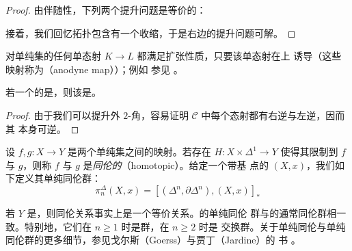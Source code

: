 \begin{proof}
由伴随性，下列两个提升问题是等价的：
\begin{center}
\end{center}
接着，我们回忆拓扑\trHorn{}包含有一个收缩，于是右边的提升问题可解。
\end{proof}
\begin{fact}\label{fact:anodyne-extension}
\trKanComplex{}对单纯集的任何单态射 $K \to L$ 都满足扩张性质，只要该单态射在\trGeometricRealization{}上
诱导\trWeakEquivalence{}（这些映射称为\emph{\trAnodyneMap{}}（anodyne map））；例如
参见 \cite[Theorem 11.3]{GJ09}。
\end{fact}

\begin{lemma}\label{lem:nerve-kan-groupoid}
若一个\trCategory{}的\trNerve{}是\trKanComplex{}，则该\trCategory{}是\trGroupoid{}。
\end{lemma}

\begin{proof}
由于我们可以提升外 $2$-角，容易证明 $\mathcal{C}$ 中每个态射都有右逆与左逆，因而其
本身可逆。
\end{proof}

\begin{definition}\label{def:homotopic}
设 $f, g\colon X \to Y$ 是两个单纯集之间的映射。若存在 $H\colon X \times \Delta^1 \to Y$
使得其限制到 $f$ 与 $g$，则称 $f$ 与 $g$ 是\emph{同伦的}（homotopic）。给定一个带基
点的\trKanComplex{} $(X, x)$，我们如下定义其单纯同伦群：
\[
\pi^{\Delta}_n(X, x) = [(\Delta^n, \partial\Delta^n), (X, x)]_{*}
\]
\end{definition}

\begin{fact}\label{fact:simplicial-homotopy-groups}
若 $Y$ 是\trKanComplex{}，则同伦关系事实上是一个等价关系。\trKanComplex{}的单纯同伦
群与\trGeometricRealization{}的通常同伦群相一致。特别地，它们在 $n \ge 1$ 时是群，在 $n \ge 2$ 时是
交换群。关于单纯同伦与单纯同伦群的更多细节，参见戈尔斯（Goerss）与贾丁（Jardine）的
书 \cite[I.6 and I.7]{GJ09}。
\end{fact}

